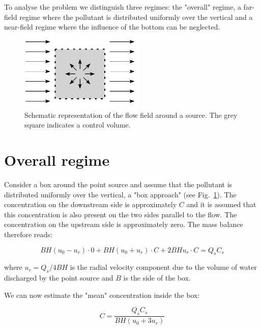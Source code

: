 \documentclass[onecolumn]{article}
\begin{document}
To analyse the problem we distinguish three regimes: the "overall" regime, a far-field regime where the
pollutant is distributed uniformly over the vertical and a near-field regime where the influence of the
bottom can be neglected.

\begin{figure}
\begin{center}
\includegraphics[width=60mm]{sketch_source.pdf}
\caption{Schematic representation of the flow field around a source. The grey square indicates
a control volume.}
\label{sketch_source}
\end{center}
\end{figure}

\section*{Overall regime}
Consider a box around the point source and assume that the pollutant is distributed uniformly over the
vertical, a "box approach" (see Fig.\ \ref{sketch_source}). The concentration on the downstream side is
approximately \(C\) and it is assumed that this concentration is also present on the two sides parallel
to the flow. The concentration on the upstream side is approximately zero. The mass balance therefore reads:

\begin{equation}
B H (u_0 - u_r) \cdot 0 + B H (u_0 + u_r) \cdot C + 2 B H u_r \cdot C = Q_s C_s
\end{equation}

\noindent where \(u_r = Q_s/4BH\) is the radial velocity component due to the volume of water discharged
by the point source and \(B\) is the side of the box.

We can now estimate the "mean" concentration inside the box:

\begin{equation}
    C = \frac{Q_s C_s}{B H (u_0 + 3 u_r)}
\end{equation}
\end{document}
